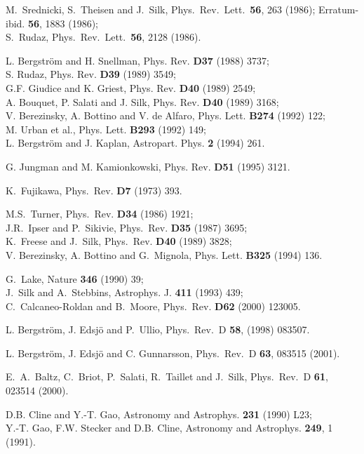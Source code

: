 \begin{thebibliography}{99}
M.~Srednicki, S.~Theisen and J.~Silk, Phys.\ Rev.\ Lett.\ {\bf 56}, 
263 (1986); Erratum-ibid. {\bf 56}, 1883 (1986);\\
S.~Rudaz, Phys.\ Rev.\ Lett.\ {\bf 56}, 2128 (1986).

L. Bergstr\"om and H. Snellman, Phys. Rev. {\bf D37} (1988) 3737;\\ 
S. Rudaz, Phys. Rev. {\bf D39} (1989) 3549; \\
G.F. Giudice and K. Griest, Phys. Rev. {\bf D40} (1989) 2549;\\ 
A. Bouquet, P. Salati and J. Silk, Phys. Rev. {\bf D40} (1989) 3168;\\ 
V. Berezinsky, A. Bottino and V. de Alfaro, Phys. Lett. {\bf B274} (1992) 
122;\\
M. Urban et al., Phys. Lett. {\bf B293} (1992) 149;\\
L. Bergstr\"om and J. Kaplan, Astropart. Phys. {\bf 2} (1994) 261.


G. Jungman and M. Kamionkowski, Phys. Rev. {\bf D51} (1995) 3121.

K.~Fujikawa, Phys.\ Rev. {\bf D7} (1973) 393.

M.S.~Turner, Phys.\ Rev. {\bf D34} (1986) 1921;\\
J.R.~Ipser and P.~Sikivie, Phys.\ Rev. {\bf D35} (1987) 3695;\\
K.~Freese and J.~Silk, Phys.\ Rev. {\bf D40} (1989) 3828;\\
V. Berezinsky, A. Bottino and G.~Mignola, Phys. Lett. {\bf B325} (1994) 136.

G.~Lake, Nature {\bf 346} (1990) 39;\\
J.~Silk and A.~Stebbins, Astrophys. J. {\bf 411} (1993) 439;\\
C.~Calcaneo-Roldan and B.~Moore, Phys.\ Rev. {\bf D62} (2000) 123005.

L. Bergstr\"om, J. Edsj\"o and P.~Ullio, Phys.\ Rev.\ D {\bf 58}, 
(1998) 083507.

L. Bergstr\"om, J. Edsj\"o and C. Gunnarsson, Phys.\ Rev.\ D {\bf 63}, 
083515 (2001).

E.~A.~Baltz, C.~Briot, P.~Salati, R.~Taillet and J.~Silk,
Phys.\ Rev.\ D {\bf 61}, 023514 (2000).

D.B. Cline and Y.-T. Gao,  Astronomy and Astrophys. {\bf 231} (1990) L23;\\
Y.-T. Gao, F.W. Stecker and D.B. Cline, Astronomy and Astrophys. {\bf 249},
1 (1991).


\end{thebibliography}
